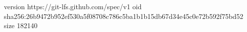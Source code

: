 version https://git-lfs.github.com/spec/v1
oid sha256:26b9472b952ef530a5f08708c786c5ba1b1b15db67d34e45c0e72b592f75bd52
size 182140
